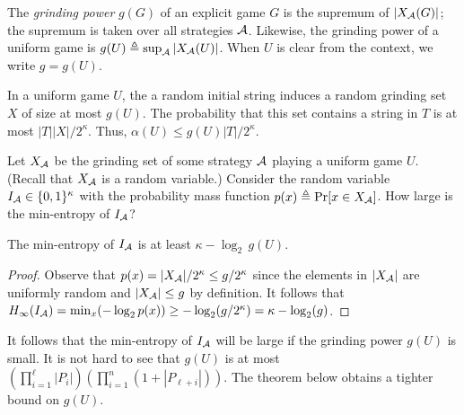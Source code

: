 \begin{definition}
    \label{def:xor-game-grinding-power} 
    The \emph{grinding power} $g(G)$ of an explicit game $G$ 
    is the supremum
    of $|X_{\mathcal{A}}(G)|$; 
    the supremum is taken over all strategies $\mathcal{A}$.
    Likewise, the grinding power of a uniform game is 
    $g(U) \triangleq \sup_{\mathcal{A}} |X_{\mathcal{A}}(U)|$. 
    When $U$ is clear from the context, we write $g = g(U)$.
\end{definition}
In a uniform game $U$, the 
a random initial string induces 
a random grinding set $X$ of size at most $g(U)$. 
The probability that this set contains a string in $T$ 
is at most $|T| |X|/2^\kappa$. 
Thus, $\alpha(U) \leq g(U) |T|/2^\kappa$. 


Let $X_{\mathcal{A}}$ be the grinding set of some strategy $\mathcal{A}$ 
playing a uniform game $U$. 
(Recall that $X_{\mathcal{A}}$ is a random variable.)
Consider the random variable $I_{\mathcal{A}} \in \{0,1\}^\kappa$ 
with the probability mass function $p(x) \triangleq \Pr[x \in X_{\mathcal{A}}]$. 
How large is the min-entropy of $I_{\mathcal{A}}$? 


\begin{lemma}\label{lemma:xor-game-minentropy}
The min-entropy of $I_{\mathcal{A}}$ is at least 
$
    \kappa - \log_2\,g(U)
$.
\end{lemma}
\begin{proof}
Observe that 
$
    p(x) 
    = {|X_{\mathcal{A}}|/2^\kappa} 
    \leq {g/2^\kappa}
$ 
since the elements in $|X_{\mathcal{A}}|$ are uniformly random 
and $|X_{\mathcal{A}}| \leq g$ by definition.
It follows that 
$
    H_\infty(I_{\mathcal{A}}) 
    = \min_x (-\log_2 p(x)) 
    \geq -\log_2 (g/2^\kappa) 
    = \kappa - \log_2(g)
$.
\end{proof}
It follows that the min-entropy of $I_{\mathcal{A}}$ will be large  
if the grinding power $g(U)$ is small. 
It is not hard to see that $g(U)$ is at most 
$\left(\prod_{i=1}^{\ell} |P_i|\right)
\left(\prod_{i=1}^{n} (1 + |P_{\ell + i}|) \right)$. 
The theorem below obtains a tighter bound on $g(U)$.

